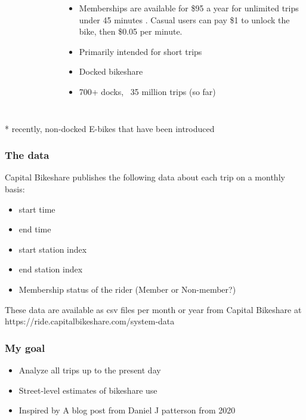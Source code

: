 \documentclass{beamer}
\begin{document}
\begin{frame}
\begin{columns}
\begin{figure}
        \end{figure}
        \begin{itemize}
            \item Memberships are available for \$95 a year for unlimited trips under 45 minutes \cite{cabisite}. Casual users can pay \$1 to unlock the bike, then \$0.05 per minute.
            \item Primarily intended for short trips
            \item Docked bikeshare
            \item 700+ docks, ~35 million trips (so far)
        \end{itemize}

    \end{columns}
    \small{* recently, non-docked E-bikes that have been introduced}
\end{frame}

\begin{frame}
    \frametitle{The data}

    Capital Bikeshare publishes the following data about each trip on a monthly basis:

    \begin{itemize}
        \item start time
        \item end time
        \item start station index
        \item end station index
        \item Membership status of the rider (Member or Non-member?)
    \end{itemize}

    These data are available as csv files per month or year from Capital Bikeshare at https://ride.capitalbikeshare.com/system-data
\end{frame}

\begin{frame}
    \frametitle{My goal}

    \begin{itemize}
        \item Analyze all trips up to the present day
        \item Street-level estimates of bikeshare use
        \item Inspired by A blog post from Daniel J patterson from 2020
    \end{itemize}

\end{frame}
\end{document}
